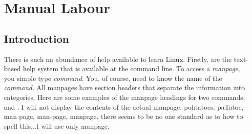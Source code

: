 \chapter{Manual Labour}
\pagestyle{fancy}
\label{ch:manual}

\fancyhf{} %
\fancyhead[OC]{\leftmark} %
\setlength{\headheight}{13.6pt} 
\cfoot{\thepage} %


		
\section{Introduction}
There is such an abundance of help available to learn Linux. Firstly,   are the text-based help system that is available at the command line.  To access a \emph{manpage}, you simple type  \emph{command}. You, of course, need to know the name of the \emph{command}. All manpages have section headers that separate the information into categories. Here are some examples of the manpage headings for two commands:  and . I will not display the contents of the actual manpage. pohtatoes, paTatoe, man page, man-page, manpage, there seems to be no one standard as to how to spell this...I will use only manpage.

